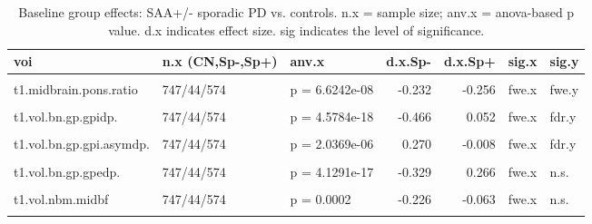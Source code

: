 \documentclass[
  table]{article}
\begin{document}
\begin{landscape}\begin{table}

\caption{\label{tab:dxresults}Baseline group effects: SAA+/- sporadic PD vs. controls. n.x = sample size; anv.x = anova-based p value. d.x indicates effect size. sig indicates the level of significance.}
\centering
\begin{tabular}[t]{lllrrll}
\toprule
voi & n.x (CN,Sp-,Sp+) & anv.x & d.x.Sp- & d.x.Sp+ & sig.x & sig.y\\
\midrule
\cellcolor{gray!22}{t1.vol.bn.str.pudp.} & \cellcolor{gray!22}{747/44/574} & \cellcolor{gray!22}{p = 6.4813e-06} & \cellcolor{gray!22}{-0.265} & \cellcolor{gray!22}{-0.080} & \cellcolor{gray!22}{fwe.x} & \cellcolor{gray!22}{fwe.y}\\
t1.midbrain.pons.ratio & 747/44/574 & p = 6.6242e-08 & -0.232 & -0.256 & fwe.x & fwe.y\\
\cellcolor{gray!22}{t1.vol.sncdp.} & \cellcolor{gray!22}{747/44/574} & \cellcolor{gray!22}{p = 2.2643e-16} & \cellcolor{gray!22}{-0.413} & \cellcolor{gray!22}{-0.302} & \cellcolor{gray!22}{fwe.x} & \cellcolor{gray!22}{fwe.y}\\
t1.vol.bn.gp.gpidp. & 747/44/574 & p = 4.5784e-18 & -0.466 & 0.052 & fwe.x & fdr.y\\
\cellcolor{gray!22}{t1.vol.bn.gp.gpe.asymdp.} & \cellcolor{gray!22}{747/44/574} & \cellcolor{gray!22}{p = 3.6180e-07} & \cellcolor{gray!22}{0.289} & \cellcolor{gray!22}{0.131} & \cellcolor{gray!22}{fwe.x} & \cellcolor{gray!22}{fdr.y}\\
\addlinespace
t1.vol.bn.gp.gpi.asymdp. & 747/44/574 & p = 2.0369e-06 & 0.270 & -0.008 & fwe.x & fdr.y\\
\cellcolor{gray!22}{t1.vol.bn.str.pu.asymdp.} & \cellcolor{gray!22}{747/44/574} & \cellcolor{gray!22}{p = 7.2291e-22} & \cellcolor{gray!22}{0.539} & \cellcolor{gray!22}{0.040} & \cellcolor{gray!22}{fwe.x} & \cellcolor{gray!22}{n.s.}\\
t1.vol.bn.gp.gpedp. & 747/44/574 & p = 4.1291e-17 & -0.329 & 0.266 & fwe.x & n.s.\\
\cellcolor{gray!22}{t1.vol.snc.asymdp.} & \cellcolor{gray!22}{747/44/574} & \cellcolor{gray!22}{p = 0.0004} & \cellcolor{gray!22}{0.213} & \cellcolor{gray!22}{0.010} & \cellcolor{gray!22}{fwe.x} & \cellcolor{gray!22}{n.s.}\\
t1.vol.nbm.midbf & 747/44/574 & p = 0.0002 & -0.226 & -0.063 & fwe.x & n.s.\\
\addlinespace
\cellcolor{gray!22}{t1.vol.nbm.antbf} & \cellcolor{gray!22}{747/44/574} & \cellcolor{gray!22}{p = 0.0022} & \cellcolor{gray!22}{-0.182} & \cellcolor{gray!22}{0.012} & \cellcolor{gray!22}{fdr.x} & \cellcolor{gray!22}{n.s.}\\

\end{tabular}
\end{table}
\end{landscape}
\end{document}
